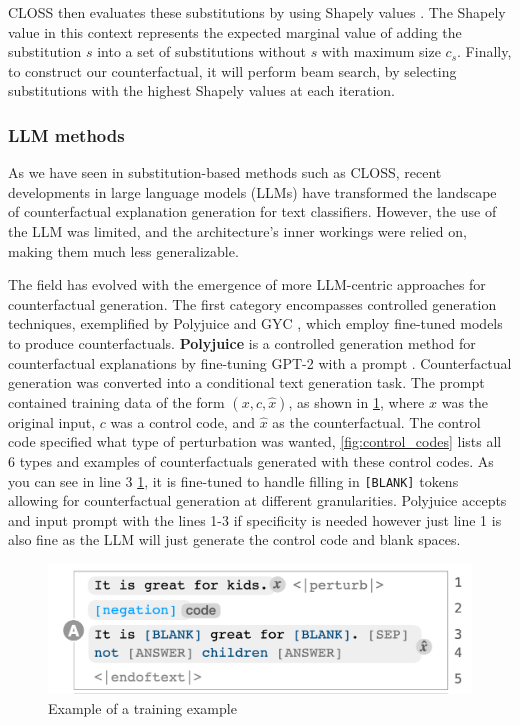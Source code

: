 CLOSS then evaluates these substitutions by using Shapely values \cite{lundberg_unified_2017}. The Shapely value in this context represents the expected marginal value of adding the substitution $s$ into a set of substitutions without $s$ with maximum size $c_s$. Finally, to construct our counterfactual, it will perform beam search, by selecting substitutions with the highest Shapely values at each iteration.

\subsubsection{LLM methods}
As we have seen in substitution-based methods such as CLOSS, recent developments in large language models (LLMs) have transformed the landscape of counterfactual explanation generation for text classifiers. However, the use of the LLM was limited, and the architecture's inner workings were relied on, making them much less generalizable.

The field has evolved with the emergence of more LLM-centric approaches for counterfactual generation. The first category encompasses controlled generation techniques, exemplified by Polyjuice \cite{wu_polyjuice_2021} and GYC \cite{madaan_generate_2021}, which employ fine-tuned models to produce counterfactuals. \textbf{Polyjuice} is a controlled generation method for counterfactual explanations by fine-tuning GPT-2 with a prompt \cite{radford_language_2019}. Counterfactual generation was converted into a conditional text generation task. The prompt contained training data of the form $(x,c,\hat{x})$, as shown in \ref{fig:train_prompt}, where $x$ was the original input, $c$ was a control code, and $\hat{x}$ as the counterfactual. The control code specified what type of perturbation was wanted, \ref{fig:control_codes} lists all 6 types and examples of counterfactuals generated with these control codes. As you can see in line 3 \ref{fig:train_prompt}, it is fine-tuned to handle filling in \texttt{[BLANK]} tokens allowing for counterfactual generation at different granularities. Polyjuice accepts and input prompt with the lines 1-3 if specificity is needed however just line 1 is also fine as the LLM will just generate the control code and blank spaces.

\begin{figure}[h]
    \centering
    \includegraphics[width=0.7\linewidth]{polyjuice_train_prompt.png}
    \caption{Example of a training example \cite{wu_polyjuice_2021}}
    \label{fig:train_prompt}
\end{figure}

